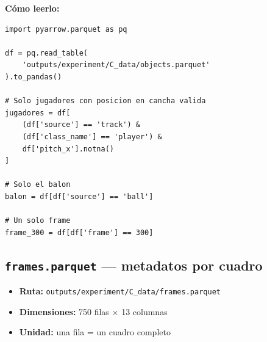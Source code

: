 \documentclass[11pt,a4paper]{article}
\begin{document}
\textbf{Cómo leerlo:}
\begin{lstlisting}[caption={Lectura básica de objects.parquet}]
import pyarrow.parquet as pq

df = pq.read_table(
    'outputs/experiment/C_data/objects.parquet'
).to_pandas()

# Solo jugadores con posicion en cancha valida
jugadores = df[
    (df['source'] == 'track') &
    (df['class_name'] == 'player') &
    df['pitch_x'].notna()
]

# Solo el balon
balon = df[df['source'] == 'ball']

# Un solo frame
frame_300 = df[df['frame'] == 300]
\end{lstlisting}

\subsection{\texttt{frames.parquet} — metadatos por cuadro}

\begin{itemize}[noitemsep]
  \item \textbf{Ruta:} \texttt{outputs/experiment/C\_data/frames.parquet}
  \item \textbf{Dimensiones:} 750 filas $\times$ 13 columnas
  \item \textbf{Unidad:} una fila = un cuadro completo
\end{itemize}
\end{document}
